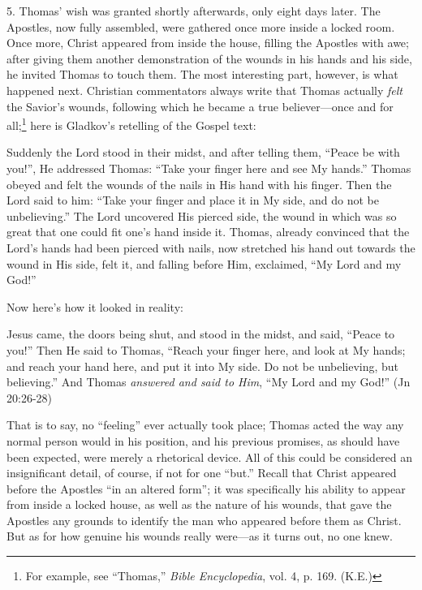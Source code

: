 5. Thomas' wish was granted shortly afterwards, only eight days later. The Apostles, now fully assembled, were gathered once more inside a locked room. Once more, Christ appeared from inside the house, filling the Apostles with awe; after giving them another demonstration of the wounds in his hands and his side, he invited Thomas to touch them. The most interesting part, however, is what happened next. Christian commentators always write that Thomas actually \emph{felt} the Savior's wounds, following which he became a true believer---once and for all;\footnote{For example, see ``Thomas,'' \emph{Bible Encyclopedia}, vol. 4, p. 169. (K.E.)} here is Gladkov's retelling of the Gospel text:

\begin{smallquote}
    Suddenly the Lord stood in their midst, and after telling them, ``Peace be with you!'', He addressed Thomas: ``Take your finger here and see My hands.'' Thomas obeyed and felt the wounds of the nails in His hand with his finger. Then the Lord said to him: ``Take your finger and place it in My side, and do not be unbelieving.'' The Lord uncovered His pierced side, the wound in which was so great that one could fit one's hand inside it. Thomas, already convinced that the Lord's hands had been pierced with nails, now stretched his hand out towards the wound in His side, felt it, and falling before Him, exclaimed, ``My Lord and my God!''
\end{smallquote}

Now here's how it looked in reality:

\begin{smallquote}
    Jesus came, the doors being shut, and stood in the midst, and said, ``Peace to you!'' Then He said to Thomas, ``Reach your finger here, and look at My hands; and reach your hand here, and put it into My side. Do not be unbelieving, but believing.'' And Thomas \emph{answered and said to Him}, ``My Lord and my God!'' (Jn 20:26-28)
\end{smallquote}
That is to say, no ``feeling'' ever actually took place; Thomas acted the way any normal person would in his position, and his previous promises, as should have been expected, were merely a rhetorical device. All of this could be considered an insignificant detail, of course, if not for one ``but.'' Recall that Christ appeared before the Apostles ``in an altered form''; it was specifically his ability to appear from inside a locked house, as well as the nature of his wounds, that gave the Apostles any grounds to identify the man who appeared before them as Christ. But as for how genuine his wounds really were---as it turns out, no one knew.

